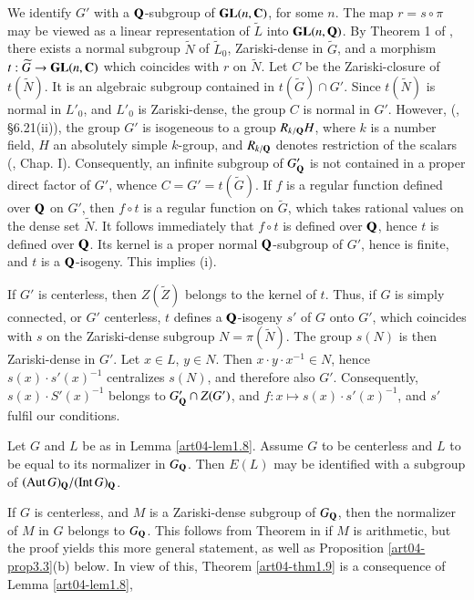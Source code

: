 We identify $G'$ with a $\mathbf{Q}$-subgroup of $\mathbf{GL}(n,\mathbf{C})$, for some $n$. The map $r=s\circ\pi$ may be viewed as a linear representation of $\widetilde{L}$ into $\mathbf{GL}(n,\mathbf{Q})$. By Theorem 1 of \cite{art04-key25}, there exists a normal subgroup $\widetilde{N}$ of $\widetilde{L}_{0}$, Zariski-dense in $\widetilde{G}$, and a morphism $t:\widetilde{G}\to \mathbf{GL}(n,\mathbf{C})$ which coincides with $r$ on $\widetilde{N}$. Let $C$ be the Zariski-closure of $t(\widetilde{N})$. It is an algebraic subgroup contained in $t(\widetilde{G})\cap G'$. Since $t(\widetilde{N})$ is normal in $L'_{0}$, and $L'_{0}$ is Zariski-dense, the group $C$ is normal in $G'$. However, (\cite{art04-key9}, \S6.21(ii)), the group $G'$ is isogeneous to a group $R_{k/\mathbf{Q}}H$, where $k$ is a number field, $H$ an absolutely simple $k$-group, and $R_{k/\mathbf{Q}}$ denotes restriction of the scalars (\cite{art04-key31}, Chap. I). Consequently, an infinite subgroup of $G'_{\mathbf{Q}}$ is not contained in a proper direct factor of $G'$, whence $C=G'=t(\widetilde{G})$. If $f$ is a regular function defined over $\mathbf{Q}$ on $G'$, then $f\circ t$ is a regular function on $\widetilde{G}$, which takes rational values on the dense set $\widetilde{N}$. It follows immediately that $f\circ t$ is defined over $\mathbf{Q}$, hence $t$ is defined over $\mathbf{Q}$. Its kernel is a proper normal $\mathbf{Q}$-subgroup of $G'$, hence is finite, and $t$ is a $\mathbf{Q}$-isogeny. This implies (i).

If $G'$ is centerless, then $Z(\widetilde{Z})$ belongs to the kernel of $t$. Thus, if $G$ is simply connected, or $G'$ centerless, $t$ defines a $\mathbf{Q}$-isogeny $s'$ of $G$ onto $G'$, which coincides with $s$ on the Zariski-dense subgroup $N=\pi(\widetilde{N})$. The group $s(N)$ is then Zariski-dense in $G'$. Let $x\in L$, $y\in N$. Then $x\cdot y\cdot x^{-1}\in N$, hence $s(x)\cdot s'(x)^{-1}$ centralizes $s(N)$, and therefore also $G'$. Consequently, $s(x)\cdot S'(x)^{-1}$ belongs to $G'_{\mathbf{Q}}\cap Z(G')$, and $f:x\mapsto s(x)\cdot s'(x)^{-1}$, and $s'$ fulfil our conditions.

\begin{theorem}\label{art04-thm1.9}
Let $G$ and $L$ be as in Lemma \ref{art04-lem1.8}. Assume $G$ to be centerless and $L$ to be equal to its normalizer in $G_{\mathbf{Q}}$. Then $E(L)$ may be identified with a subgroup of $(\operatorname{\mathrm{Aut}} G)_{\mathbf{Q}}/(\operatorname{\mathrm{Int}} G)_{\mathbf{Q}}$.
\end{theorem}

If $G$ is centerless, and $M$ is a Zariski-dense subgroup of $G_{\mathbf{Q}}$, then the normalizer of $M$ in $G$ belongs to $G_{\mathbf{Q}}$. This follows from Theorem in \cite{art04-key6} if $M$ is arithmetic, but the proof yields this more general statement, as well as Proposition \ref{art04-prop3.3}(b) below. In view of this, Theorem \ref{art04-thm1.9} is a consequence of Lemma \ref{art04-lem1.8},

